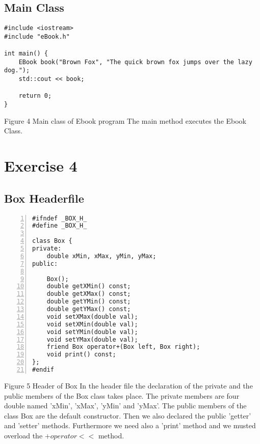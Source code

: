 \documentclass{llncs}
\begin{document}
\subsection{Main Class}

\begin{lstlisting}
#include <iostream>
#include "eBook.h"

int main() {
	EBook book("Brown Fox", "The quick brown fox jumps over the lazy dog.");
	std::cout << book; 

	return 0; 
}
\end{lstlisting}
\scriptsize{Figure 4 Main class of Ebook program}\newline
\newline
The main method executes the Ebook Class.
\section{Exercise 4}
\subsection{Box Headerfile}

\begin{lstlisting}[basicstyle=\footnotesize\ttfamily, numbers=left, stepnumber=1, numberstyle = \normalsize]
#ifndef _BOX_H_
#define _BOX_H_

class Box {
private:
	double xMin, xMax, yMin, yMax;
public:
	
	Box();
	double getXMin() const;
	double getXMax() const;
	double getYMin() const;
	double getYMax() const;
	void setXMax(double val);
	void setXMin(double val);
	void setYMin(double val);
	void setYMax(double val);
	friend Box operator+(Box left, Box right);
	void print() const;
};
#endif
\end{lstlisting}
\scriptsize{Figure 5 Header of Box}\newline
\newline
\newline
In the header file the declaration of the private and the public members of the Box class takes place.\newline
The private members are four double named 'xMin', 'xMax', 'yMin' and 'yMax'.
The public members of the class Box are the default constructor.\newline 
Then we also declared the public 'getter' and 'setter' methods. Furthermore we need also a 'print' method and we musted overload the $+operator<<$ method.\newline
\end{document}
